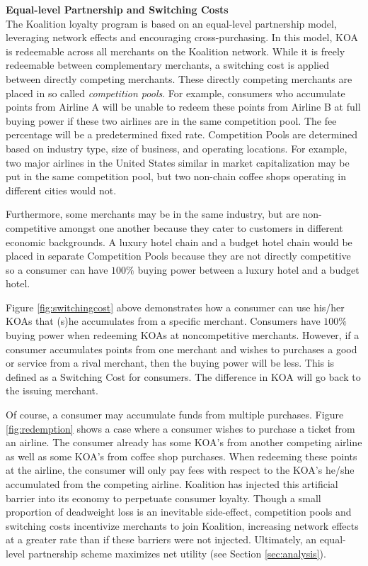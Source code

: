 \noindent \textbf{Equal-level Partnership and Switching Costs} \\
The Koalition loyalty program is based on an equal-level partnership model, leveraging network effects and encouraging cross-purchasing. In this model, KOA is redeemable across all merchants on the Koalition network. While it is freely redeemable between complementary merchants, a switching cost is applied between directly competing merchants. These directly competing merchants are placed in so called \textit{competition pools}. For example, consumers who accumulate points from Airline A will be unable to redeem these points from Airline B at full buying power if these two airlines are in the same competition pool. The fee percentage will be a predetermined fixed rate. Competition Pools are determined based on industry type, size of business, and operating locations. For example, two major airlines in the United States similar in market capitalization may be put in the same competition pool, but two non-chain coffee shops operating in different cities would not.

	
Furthermore, some merchants may be in the same industry, but are non-competitive amongst one another because they cater to customers in different economic backgrounds. A luxury hotel chain and a budget hotel chain would be placed in separate Competition Pools because they are not directly competitive so a consumer can have $100\%$ buying power between a luxury hotel and a budget hotel. 

Figure \ref{fig:switchingcost} above demonstrates how a consumer can use his/her KOAs that (s)he accumulates from a specific merchant. Consumers have $100\%$ buying power when redeeming KOAs at noncompetitive merchants. However, if a consumer accumulates points from one merchant and wishes to purchases a good or service from a rival merchant, then the buying power will be less. This is defined as a Switching Cost for consumers. The difference in KOA will go back to the issuing merchant. 

Of course, a consumer may accumulate funds from multiple purchases. Figure \ref{fig:redemption} shows a case where a consumer wishes to purchase a ticket from an airline. The consumer already has some KOA's from another competing airline as well as some KOA's from coffee shop purchases. When redeeming these points at the airline, the consumer will only pay fees with respect to the KOA's he/she accumulated from the competing airline. Koalition has injected this artificial barrier into its economy to perpetuate consumer loyalty. Though a small proportion of deadweight loss is an inevitable side-effect, competition pools and switching costs incentivize merchants to join Koalition, increasing network effects at a greater rate than if these barriers were not injected. Ultimately, an equal-level partnership scheme maximizes net utility (see Section \ref{sec:analysis}).

